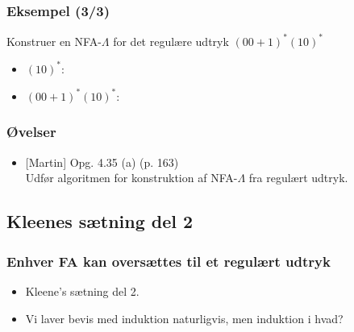 \begin{frame}
\frametitle{Eksempel (3/3)}
Konstruer en NFA-$\Lambda$ for det regulære udtryk $(00+1)^*(10)^*$
\begin{itemize}
\item $(10)^*$:\\
\begin{center}
\end{center}
\item $(00+1)^*(10)^*$: \\
\begin{center}
\end{center}
\end{itemize}
\end{frame}

\begin{frame}
\frametitle{Øvelser}
\begin{itemize}
\item{} [Martin] Opg. 4.35 (a) (p. 163)\\
Udfør algoritmen for konstruktion af NFA-$\Lambda$ fra regulært udtryk. 
\end{itemize}
\end{frame}
\subsection{Kleenes sætning del 2}
\begin{frame}
  \frametitle{Enhver FA kan oversættes til et regulært udtryk}
\begin{itemize}
\item Kleene's sætning del 2.
\item Vi laver bevis med induktion naturligvis, men induktion i hvad?
\end{itemize}
\end{frame}

